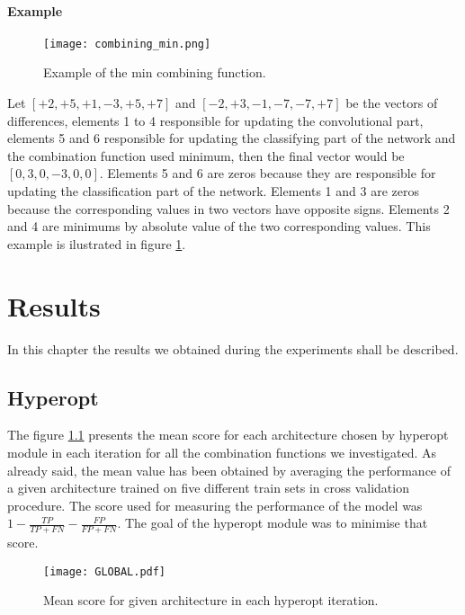 \documentclass[a4paper,10pt]{report}
\begin{document}
      \subsubsection{Example}
      \begin{figure}[h!]
	  \centering
	  \texttt{[image: combining\_min.png]}
	  \caption{Example of the min combining function.}
	  \label{fig:combining}
	\end{figure} 
      
      Let $[+2, +5, +1, -3, +5, +7]$ and $[-2, +3, -1, -7, -7, +7]$ be the vectors of differences, elements 1 to 4 responsible for updating the convolutional part, elements 5 and 6 responsible for updating the classifying part of the network and the combination function used minimum, then the final vector would be $[0, 3, 0, -3, 0, 0]$. Elements 5 and 6 are zeros because they are responsible for updating the classification part of the network. Elements 1 and 3 are zeros because the corresponding values in two vectors have opposite signs. Elements 2 and 4 are minimums by absolute value of the two corresponding values. This example is ilustrated in figure \ref{fig:combining}. 
      
      
   \chapter{Results}\label{Results}
    In this chapter the results we obtained during the experiments shall be described.
   
   \section{Hyperopt}
   
    The figure \ref{GLOBAL} presents the mean score for each architecture chosen by hyperopt module in each iteration for all the combination functions we investigated. As already said, the mean value has been obtained by averaging the performance of a given architecture trained on five different train sets in cross validation procedure. The score used for measuring the performance of the model was $1-\frac{TP}{TP + FN} - \frac{FP}{FP + FN}$. The goal of the hyperopt module was to minimise that score.
    
    \begin{figure}[h!]
	\centering
	\texttt{[image: GLOBAL.pdf]}
	\caption{Mean score for given architecture in each hyperopt iteration.}
	\label{GLOBAL}
    \end{figure} 
    
\end{document}
